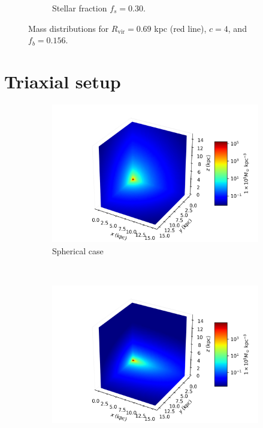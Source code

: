 \begin{figure}[h]
\begin{subfigure}[b]{0.49\textwidth}
				\caption{Stellar fraction $f_s = 0.30$.}
				\label{fig: baryonicprofilelow}
			\end{subfigure}
			\caption{Mass distributions for $R_\text{vir} = 0.69$ kpc (red line), $c = 4$, and $f_b = 0.156$.}
			\label{fig: massprofiles}
		\end{figure}
	
	\section{Triaxial setup}
		\begin{figure}[h]
			\centering
			\begin{subfigure}[t]{0.49\textwidth}
				\includegraphics[width = \textwidth]{"../Files/Week 7/symmetric"}
				\caption{Spherical case}
				\label{fig: symmetricDensity3d}
			\end{subfigure}
			~ 
			\begin{subfigure}[t]{0.49\textwidth}
				\includegraphics[width=\textwidth]{"../Files/Week 7/triaxial"}

\end{subfigure}
\end{figure}
